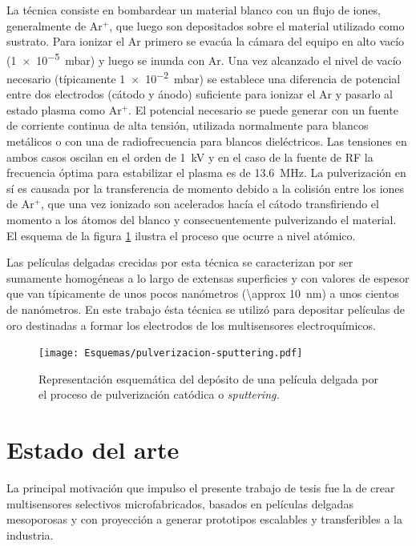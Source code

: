 		La técnica consiste en bombardear un material blanco con un flujo de iones, generalmente de Ar$^+$, que luego son depositados sobre el material utilizado como sustrato. Para ionizar el Ar primero se evacúa la cámara del equipo en alto vacío (\SI{1e-5}{\milli\bar}) y luego se inunda con Ar. Una vez alcanzado el nivel de vacío necesario (típicamente \SI{1e-2}{\milli\bar}) se establece una diferencia de potencial entre dos electrodos (cátodo y ánodo) suficiente para ionizar el Ar y pasarlo al estado plasma como Ar$^{+}$. El potencial necesario se puede generar con un fuente de corriente continua de alta tensión, utilizada normalmente para blancos metálicos o con una de radiofrecuencia para blancos dieléctricos. Las tensiones en ambos casos oscilan en el orden de \SI{1}{\kilo\volt} y en el caso de la fuente de RF la frecuencia óptima para estabilizar el plasma es de \SI{13.6}{\mega\hertz}. La pulverización en sí es causada por la transferencia de momento debido a la colisión entre los iones de Ar$^+$, que una vez ionizado son acelerados hacía el cátodo transfiriendo el momento a los átomos del blanco y consecuentemente pulverizando el material. El esquema de la figura \ref{fig:sssspputt} ilustra el proceso que ocurre a nivel atómico. \cite{Behrisch1981,sigmund1968,Bhatt2007}
	
		Las películas delgadas crecidas por esta técnica se caracterizan por ser sumamente homogéneas a lo largo de extensas superficies y con valores de espesor que van típicamente de unos pocos nanómetros (\SI{\approx 10}{\nm}) a unos cientos de nanómetros. En este trabajo ésta técnica se utilizó para depositar películas de oro destinadas a formar los electrodos de los multisensores electroquímicos.

				\begin{figure}[h!]
 				\begin{center}
 				\texttt{[image: Esquemas/pulverizacion-sputtering.pdf]}
 				\caption[Etapas del proceso de pulverización catódica]{Representación esquemática del depósito de una película delgada por el proceso de pulverización catódica o \textit{sputtering.}}
 		   		\label{fig:sssspputt}
 		    	\end{center}
 		    	\end{figure}			

\section{Estado del arte}
	 		    		
	La principal motivación que impulso el presente trabajo de tesis fue la de crear multisensores selectivos microfabricados, basados en películas delgadas mesoporosas y con proyección a generar prototipos escalables y transferibles a la industria. 

